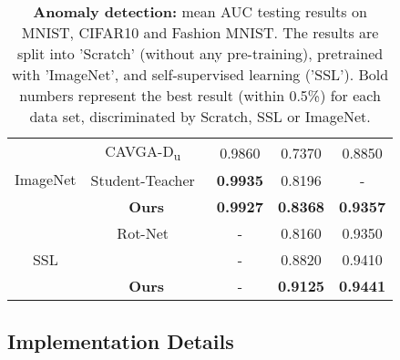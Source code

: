 \documentclass[letterpaper]{article} \usepackage{aaai22}  \usepackage{times}  \usepackage{helvet}  \usepackage{courier}  \usepackage[hyphens]{url}  \usepackage{graphicx} \urlstyle{rm} \def\UrlFont{\rm}  \usepackage{natbib}  \usepackage{caption} \DeclareCaptionStyle{ruled}{labelfont=normalfont,labelsep=colon,strut=off} \frenchspacing  \setlength{\pdfpagewidth}{8.5in}  \setlength{\pdfpageheight}{11in}  \usepackage{algorithm}
\begin{document}
\begin{table}[t!]
{\begin{tabular}{@{}c|c|ccc@{}}
\\\hline
\multirow{3}{*}{ImageNet} &CAVGA-D\textsubscript{u}~\cite{venkataramanan2019attention} 	&	0.9860        &	0.7370	    &  0.8850      \\	
&Student-Teacher~\cite{bergmann2020uninformed}	        &	\textbf{0.9935}	        &	0.8196	  &  -      \\
&\textbf{Ours}	            &	\textbf{0.9927}	&	\textbf{0.8368}	 & \textbf{0.9357} 
\\\hline
\multirow{3}{*}{SSL}
&Rot-Net~\cite{golan2018deep}	        &	-        &	0.8160	  &  0.9350     \\	
 &\citet{bergman2020classification}	        &	-        &	0.8820	  &  0.9410     \\
&\textbf{Ours}	            &	-	& 	\textbf{0.9125}	 & \textbf{0.9441}\\ 

\bottomrule
\end{tabular}}
\caption{\textbf{Anomaly detection:} mean AUC testing results on MNIST, CIFAR10 and Fashion MNIST. The results are split into 'Scratch' (without any pre-training), pretrained with 'ImageNet', and self-supervised learning ('SSL'). Bold numbers represent the best result (within 0.5\%) for each data set, discriminated by Scratch, SSL or ImageNet.}
\label{tab:auc_detection_mnist_cifar10_fmnist}
\end{table}

\subsection{Implementation Details}
\end{document}
